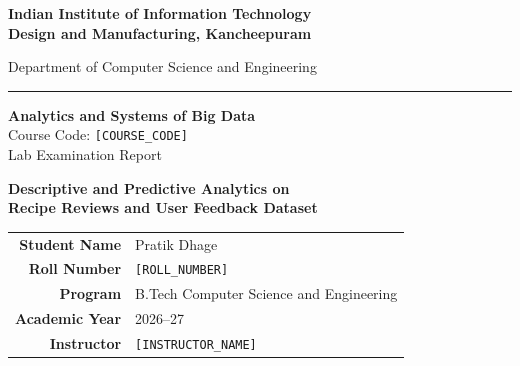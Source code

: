 \documentclass[12pt,a4paper]{article}
\begin{document}
\begin{titlepage}
\begin{center}

\vspace*{0.5cm}

{\LARGE\bfseries\textcolor{iiitblue}{Indian Institute of Information Technology\\[4pt]
Design and Manufacturing, Kancheepuram}}

\vspace{6pt}
{\large Department of Computer Science and Engineering}

\vspace{4pt}
\textcolor{accentgold}{\rule{0.6\textwidth}{1.5pt}}

\vspace{1.2cm}

{\Large\textbf{Analytics and Systems of Big Data}}\\[6pt]
{\large Course Code: \texttt{[COURSE\_CODE]}}\\[6pt]
{\large Lab Examination Report}

\vspace{1.2cm}

\begin{tcolorbox}[colback=iiitblue!5, colframe=iiitblue, boxrule=1pt,
    arc=5pt, width=0.92\textwidth]
\centering
{\LARGE\bfseries\textcolor{iiitblue}{Descriptive and Predictive Analytics on\\[6pt]
Recipe Reviews and User Feedback Dataset}}
\end{tcolorbox}

\vspace{1.5cm}

\begin{tabular}{r l}
\textbf{Student Name}    & Pratik Dhage \\[4pt]
\textbf{Roll Number}     & \texttt{[ROLL\_NUMBER]} \\[4pt]
\textbf{Program}         & B.Tech Computer Science and Engineering \\[4pt]
\textbf{Academic Year}   & 2026--27 \\[4pt]
\textbf{Instructor}      & \texttt{[INSTRUCTOR\_NAME]} \\
\end{tabular}


\end{center}
\end{titlepage}
\end{document}
